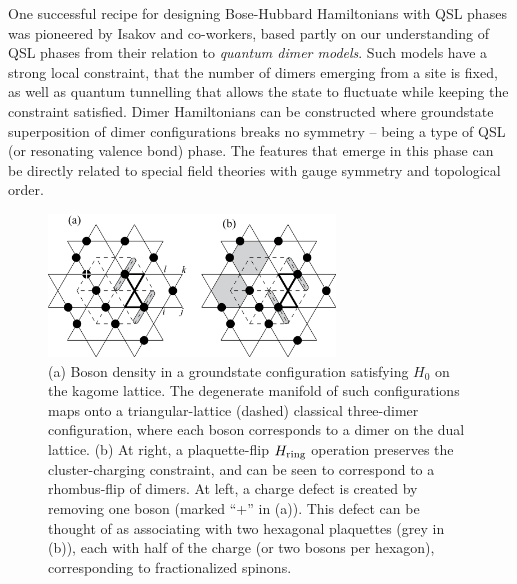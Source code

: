 \documentclass[aps,prb,groupedaddress,twocolumn]{revtex4}
\begin{document}
One successful recipe for designing Bose-Hubbard Hamiltonians with QSL phases was pioneered by Isakov and co-workers,\cite{Isakov1, Isakov2, TopoEE} based partly on our understanding of QSL phases from their relation to {\it quantum dimer models}.  Such models have a strong local constraint, that the number of dimers emerging from a site is fixed, as well as quantum tunnelling that allows the state to fluctuate while keeping the constraint satisfied.  Dimer Hamiltonians can be constructed where groundstate superposition of dimer configurations breaks no symmetry -- being a type of QSL (or resonating valence bond) phase.  The features that emerge in this phase can be directly related to special field theories with gauge symmetry and topological order.


\begin{figure}
\includegraphics[width=3in]{kagome.pdf}
  \caption{ (a) Boson density in a groundstate configuration satisfying $H_0$ on the kagome lattice.  The degenerate manifold of such configurations maps onto a triangular-lattice (dashed) classical three-dimer configuration, where each boson corresponds to a dimer on the dual lattice.  (b) At right, a plaquette-flip $H_{\rm ring}$ operation preserves the cluster-charging constraint, and can be seen to correspond to a rhombus-flip of dimers.  At left, a charge defect is created by removing one boson (marked ``+'' in (a)).  This defect can be thought of as associating with two hexagonal plaquettes (grey in (b)), each with half of the charge (or two bosons per hexagon), corresponding to fractionalized spinons.}
\end{figure}
\end{document}
